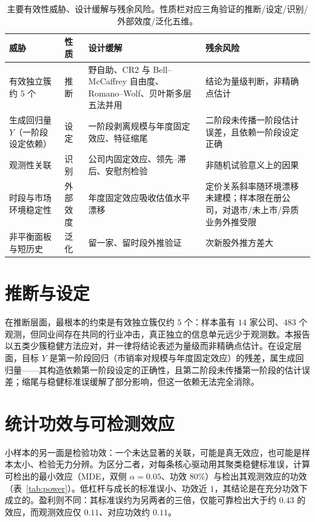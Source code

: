 \documentclass[UTF8, a4paper, fontset=none, zihao=-4]{ctexrep}
\begin{document}
\begin{table}[htbp]
\caption{主要有效性威胁、设计缓解与残余风险。性质栏对应三角验证的推断/设定/识别/外部效度/泛化五维。}
\label{tab:threats}
\footnotesize
\renewcommand{\arraystretch}{1.45}
\setlength{\tabcolsep}{5pt}
\begin{tabularx}{\textwidth}{@{}llXX@{}}
\toprule
\textbf{\color{brandblue}威胁} & \textbf{\color{brandblue}性质} & \textbf{\color{brandblue}设计缓解} & \textbf{\color{brandblue}残余风险} \\
\midrule
有效独立簇约 $5$ 个 & 推断 & 野自助、CR2 与 Bell--McCaffrey 自由度、Romano--Wolf、贝叶斯多层五法并用 & 结论为量级判断，非精确点估计 \\
生成回归量 $Y$（一阶段设定依赖） & 设定 & 一阶段剥离规模与年度固定效应、特征缩尾 & 二阶段未传播一阶段估计误差，且依赖一阶段设定正确 \\
观测性关联 & 识别 & 公司内固定效应、领先--滞后、安慰剂检验 & 非随机试验意义上的因果 \\
时段与市场环境稳定性 & 外部效度 & 年度固定效应吸收估值水平漂移 & 定价关系斜率随环境漂移未建模；样本限在册公司，对退市/未上市/异质业务外推受限 \\
非平衡面板与短历史 & 泛化 & 留一家、留时段外推验证 & 次新股外推方差大 \\
\bottomrule
\end{tabularx}
\end{table}

\section{推断与设定}
在推断层面，最根本的约束是有效独立簇仅约 $5$ 个：样本虽有 $14$ 家公司、$483$ 个观测，但同业间存在共同的行业冲击，真正独立的信息单元远少于观测数。本报告以五类少簇稳健方法应对，并一律将结论表述为量级而非精确点估计。在设定层面，目标 $Y$ 是第一阶段回归（市销率对规模与年度固定效应）的残差，属生成回归量——其构造依赖第一阶段设定的正确性，且第二阶段未传播第一阶段的估计误差；缩尾与稳健标准误缓解了部分影响，但这一依赖无法完全消除。

\section{统计功效与可检测效应}
小样本的另一面是检验功效：一个未达显著的关联，可能是真无效应，也可能是样本太小、检验无力分辨。为区分二者，对每条核心驱动用其聚类稳健标准误，计算可检出的最小效应（MDE，双侧 $\alpha=0.05$、功效 $80\%$）与检出其观测效应的功效（表~\ref{tab:power}）。低杠杆与成长的标准误小、功效近 $1$，其结论是在充分功效下成立的。盈利则不同：其标准误约为另两者的三倍，仅能可靠检出大于约 $0.43$ 的效应，而观测效应仅 $0.11$、对应功效约 $0.11$。
\end{document}
